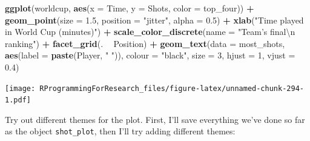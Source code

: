 \documentclass[]{book}
\makeatletter
\newenvironment{Shaded}{\begin{snugshade}}{\end{snugshade}}
\newcommand{\KeywordTok}[1]{\textcolor[rgb]{0.13,0.29,0.53}{\textbf{#1}}}
\newcommand{\DataTypeTok}[1]{\textcolor[rgb]{0.13,0.29,0.53}{#1}}
\newcommand{\DecValTok}[1]{\textcolor[rgb]{0.00,0.00,0.81}{#1}}
\newcommand{\FloatTok}[1]{\textcolor[rgb]{0.00,0.00,0.81}{#1}}
\newcommand{\CharTok}[1]{\textcolor[rgb]{0.31,0.60,0.02}{#1}}
\newcommand{\StringTok}[1]{\textcolor[rgb]{0.31,0.60,0.02}{#1}}
\newcommand{\OperatorTok}[1]{\textcolor[rgb]{0.81,0.36,0.00}{\textbf{#1}}}
\newcommand{\NormalTok}[1]{#1}
\newenvironment{kframe}{%
\medskip{}
\setlength{\fboxsep}{.8em}
 \def\at@end@of@kframe{}%
 \ifinner\ifhmode%
  \def\at@end@of@kframe{\end{minipage}}%
  \begin{minipage}{\columnwidth}%
 \fi\fi%
 \def\FrameCommand##1{\hskip\@totalleftmargin \hskip-\fboxsep
 \colorbox{shadecolor}{##1}\hskip-\fboxsep
     \hskip-\linewidth \hskip-\@totalleftmargin \hskip\columnwidth}%
 \MakeFramed {\advance\hsize-\width
   \@totalleftmargin\z@ \linewidth\hsize
   \@setminipage}}%
 {\par\unskip\endMakeFramed%
 \at@end@of@kframe}
\renewenvironment{Shaded}{\begin{kframe}}{\end{kframe}}
\theoremstyle{definition}
\theoremstyle{definition}
\theoremstyle{definition}
\theoremstyle{remark}
\makeatother
\begin{document}
\begin{Shaded}
\begin{Highlighting}[]
\KeywordTok{ggplot}\NormalTok{(worldcup, }\KeywordTok{aes}\NormalTok{(}\DataTypeTok{x =}\NormalTok{ Time, }\DataTypeTok{y =}\NormalTok{ Shots,}
                     \DataTypeTok{color =}\NormalTok{ top_four)) }\OperatorTok{+}
\StringTok{        }\KeywordTok{geom_point}\NormalTok{(}\DataTypeTok{size =} \FloatTok{1.5}\NormalTok{, }\DataTypeTok{position =} \StringTok{"jitter"}\NormalTok{,}
                   \DataTypeTok{alpha =} \FloatTok{0.5}\NormalTok{)  }\OperatorTok{+}\StringTok{ }
\StringTok{        }\KeywordTok{xlab}\NormalTok{(}\StringTok{"Time played in World Cup (minutes)"}\NormalTok{) }\OperatorTok{+}\StringTok{ }
\StringTok{        }\KeywordTok{scale_color_discrete}\NormalTok{(}\DataTypeTok{name =} \StringTok{"Team's final}\CharTok{\textbackslash{}n}\StringTok{ ranking"}\NormalTok{) }\OperatorTok{+}\StringTok{ }
\StringTok{        }\KeywordTok{facet_grid}\NormalTok{(. }\OperatorTok{~}\StringTok{ }\NormalTok{Position) }\OperatorTok{+}\StringTok{ }
\StringTok{        }\KeywordTok{geom_text}\NormalTok{(}\DataTypeTok{data =}\NormalTok{ most_shots,}
                  \KeywordTok{aes}\NormalTok{(}\DataTypeTok{label =} \KeywordTok{paste}\NormalTok{(Player, }\StringTok{" "}\NormalTok{)),}
                  \DataTypeTok{colour =} \StringTok{"black"}\NormalTok{, }\DataTypeTok{size =} \DecValTok{3}\NormalTok{,}
                  \DataTypeTok{hjust =} \DecValTok{1}\NormalTok{, }\DataTypeTok{vjust =} \FloatTok{0.4}\NormalTok{)}
\end{Highlighting}
\end{Shaded}

\texttt{[image: RProgrammingForResearch\_files/figure-latex/unnamed-chunk-294-1.pdf]}

Try out different themes for the plot. First, I'll save everything we've
done so far as the object \texttt{shot\_plot}, then I'll try adding
different themes:
\end{document}
